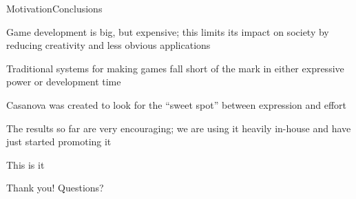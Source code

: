 \documentclass{beamer}
\begin{document}
\begin{slide}{Motivation}{Conclusions}{
\item Game development is big, but expensive; this limits its impact on society by reducing creativity and less obvious applications
\item Traditional systems for making games fall short of the mark in either expressive power or development time
\item Casanova was created to look for the ``sweet spot'' between expression and effort
\item The results so far are very encouraging; we are using it heavily in-house and have just started promoting it
}\end{slide}


\begin{frame}{This is it}
\begin{block}{Thank you!}
Questions?
\end{block}
\end{frame}
\end{document}
